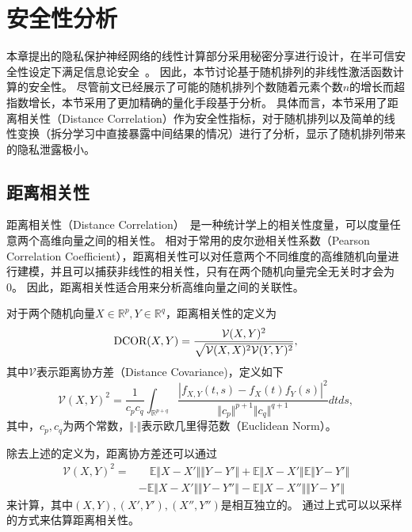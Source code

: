 \section{安全性分析}
本章提出的隐私保护神经网络的线性计算部分采用秘密分享进行设计，在半可信安全性设定下满足信息论安全~\cite{demmler2015aby}。
%
因此，本节讨论基于随机排列的非线性激活函数计算的安全性。
%
尽管前文已经展示了可能的随机排列个数随着元素个数$n$的增长而超指数增长，本节采用了更加精确的量化手段基于分析。
%
具体而言，本节采用了距离相关性（Distance Correlation）作为安全性指标，对于随机排列以及简单的线性变换（拆分学习中直接暴露中间结果的情况）进行了分析，显示了随机排列带来的隐私泄露极小。

\subsection{距离相关性}
距离相关性（Distance Correlation）~\cite{szekely2007dcor,szekely2009brownian_dcor}是一种统计学上的相关性度量，可以度量任意两个高维向量之间的相关性。
相对于常用的皮尔逊相关性系数（Pearson Correlation Coefficient），距离相关性可以对任意两个不同维度的高维随机向量进行建模，并且可以捕获非线性的相关性，只有在两个随机向量完全无关时才会为0。
%
因此，距离相关性适合用来分析高维向量之间的关联性。

\begin{definition}[距离相关性]
    对于两个随机向量$X \in \mathbb R^p, Y\in \mathbb R^q$，距离相关性的定义为
    \begin{equation}
        \textnormal{DCOR}(X, Y) = \dfrac{\mathcal{V}(X, Y)^2}{\sqrt{\mathcal{V}(X, X)^2\mathcal{V}(Y, Y)^2}},
    \end{equation}
    其中$\mathcal{V}$表示距离协方差（Distance Covariance)，定义如下
    \begin{equation}
        \mathcal{V}(X, Y)^2 = \dfrac{1}{c_pc_q} \int_{\mathbb R^{p + q}}
        \dfrac{|f_{X, Y}(t, s) - f_X(t)f_Y(s)|^2}{\Vert c_p \Vert^{p+1}\Vert c_q \Vert^{q+1}}dtds,
    \end{equation}
    其中，$c_p, c_q$为两个常数，$\Vert \cdot \Vert$表示欧几里得范数（Euclidean Norm）。
\end{definition}

除去上述的定义为，距离协方差还可以通过
\begin{equation}
\begin{split}
    \mathcal{V}(X, Y)^2 = 
    & \quad \mathbb E \Vert X-X'\Vert \Vert Y -Y'\Vert +\mathbb E\Vert X -X' \Vert \mathbb E \Vert Y -Y' \Vert
    \\ & 
    - \mathbb E\Vert X-X'\Vert  \Vert Y -Y''\Vert - \mathbb E \Vert X -X''\Vert  \Vert Y -Y' \Vert
\end{split}
\end{equation}
来计算，其中$(X, Y), (X', Y'), (X'', Y'')$是相互独立的。
%
通过上式可以以采样的方式来估算距离相关性。

